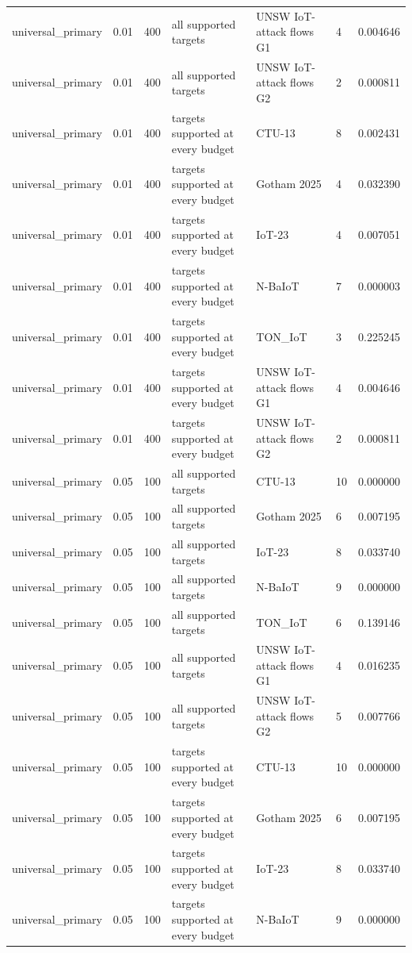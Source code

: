 \begin{tabular}{lllllll}
universal\_primary & 0.01 & 400 & all supported targets & UNSW IoT-attack flows G1 & 4 & 0.004646 \\
universal\_primary & 0.01 & 400 & all supported targets & UNSW IoT-attack flows G2 & 2 & 0.000811 \\
universal\_primary & 0.01 & 400 & targets supported at every budget & CTU-13 & 8 & 0.002431 \\
universal\_primary & 0.01 & 400 & targets supported at every budget & Gotham 2025 & 4 & 0.032390 \\
universal\_primary & 0.01 & 400 & targets supported at every budget & IoT-23 & 4 & 0.007051 \\
universal\_primary & 0.01 & 400 & targets supported at every budget & N-BaIoT & 7 & 0.000003 \\
universal\_primary & 0.01 & 400 & targets supported at every budget & TON\_IoT & 3 & 0.225245 \\
universal\_primary & 0.01 & 400 & targets supported at every budget & UNSW IoT-attack flows G1 & 4 & 0.004646 \\
universal\_primary & 0.01 & 400 & targets supported at every budget & UNSW IoT-attack flows G2 & 2 & 0.000811 \\
universal\_primary & 0.05 & 100 & all supported targets & CTU-13 & 10 & 0.000000 \\
universal\_primary & 0.05 & 100 & all supported targets & Gotham 2025 & 6 & 0.007195 \\
universal\_primary & 0.05 & 100 & all supported targets & IoT-23 & 8 & 0.033740 \\
universal\_primary & 0.05 & 100 & all supported targets & N-BaIoT & 9 & 0.000000 \\
universal\_primary & 0.05 & 100 & all supported targets & TON\_IoT & 6 & 0.139146 \\
universal\_primary & 0.05 & 100 & all supported targets & UNSW IoT-attack flows G1 & 4 & 0.016235 \\
universal\_primary & 0.05 & 100 & all supported targets & UNSW IoT-attack flows G2 & 5 & 0.007766 \\
universal\_primary & 0.05 & 100 & targets supported at every budget & CTU-13 & 10 & 0.000000 \\
universal\_primary & 0.05 & 100 & targets supported at every budget & Gotham 2025 & 6 & 0.007195 \\
universal\_primary & 0.05 & 100 & targets supported at every budget & IoT-23 & 8 & 0.033740 \\
universal\_primary & 0.05 & 100 & targets supported at every budget & N-BaIoT & 9 & 0.000000 \\

\end{tabular}
